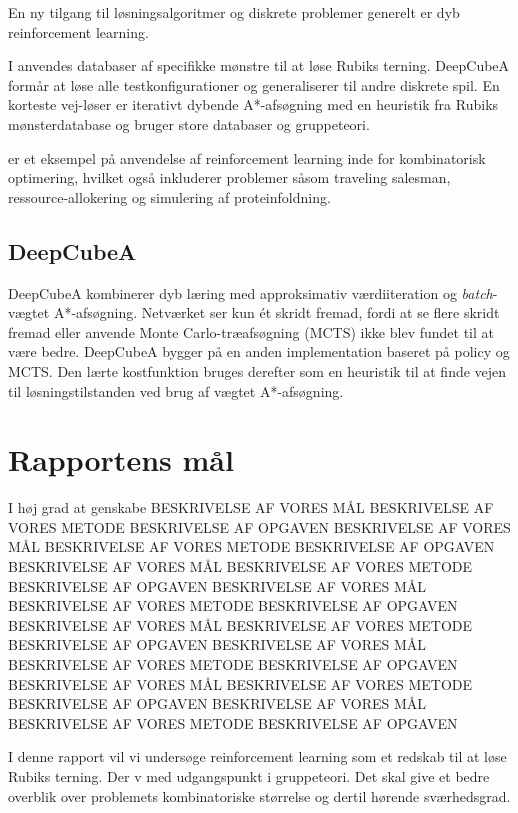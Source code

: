 \documentclass[../main.tex]{subfiles}
\begin{document}
En ny tilgang til løsningsalgoritmer og diskrete problemer generelt er dyb reinforcement learning. 


I \cite{SolvingNature} anvendes databaser af specifikke mønstre til at løse Rubiks terning. DeepCubeA formår at løse alle testkonfigurationer og generaliserer til andre diskrete spil. En korteste vej-løser er iterativt dybende A*-afsøgning med en heuristik fra Rubiks mønsterdatabase og bruger store databaser og gruppeteori. 
 
\cite{RubiksMedium} er et eksempel på anvendelse af reinforcement learning inde for kombinatorisk optimering, hvilket også inkluderer problemer såsom traveling salesman, ressource-allokering og simulering af proteinfoldning. 

\subsection{DeepCubeA}
DeepCubeA \cite{SolvingNature} kombinerer dyb læring med approksimativ værdiiteration og \emph{batch}-vægtet A*-afsøgning.
Netværket ser kun ét skridt fremad, fordi at se flere skridt fremad eller anvende Monte Carlo-træafsøgning (MCTS) ikke blev fundet til at være bedre.
DeepCubeA bygger på en anden implementation baseret på policy og MCTS.
Den lærte kostfunktion bruges derefter som en heuristik til at finde vejen til løsningstilstanden ved brug af vægtet A*-afsøgning.


\section{Rapportens mål}
I høj grad at genskabe \cite{HumansBeGone}
BESKRIVELSE AF VORES MÅL BESKRIVELSE AF VORES METODE BESKRIVELSE AF OPGAVEN BESKRIVELSE AF VORES MÅL BESKRIVELSE AF VORES METODE BESKRIVELSE AF OPGAVEN BESKRIVELSE AF VORES MÅL BESKRIVELSE AF VORES METODE BESKRIVELSE AF OPGAVEN BESKRIVELSE AF VORES MÅL BESKRIVELSE AF VORES METODE BESKRIVELSE AF OPGAVEN 
BESKRIVELSE AF VORES MÅL BESKRIVELSE AF VORES METODE BESKRIVELSE AF OPGAVEN BESKRIVELSE AF VORES MÅL BESKRIVELSE AF VORES METODE BESKRIVELSE AF OPGAVEN BESKRIVELSE AF VORES MÅL BESKRIVELSE AF VORES METODE BESKRIVELSE AF OPGAVEN BESKRIVELSE AF VORES MÅL BESKRIVELSE AF VORES METODE BESKRIVELSE AF OPGAVEN 

I denne rapport vil vi undersøge reinforcement learning som et redskab til at løse Rubiks terning.
Der v med udgangspunkt i gruppeteori.
Det skal give et bedre overblik over problemets kombinatoriske størrelse og dertil hørende sværhedsgrad.
\end{document}
